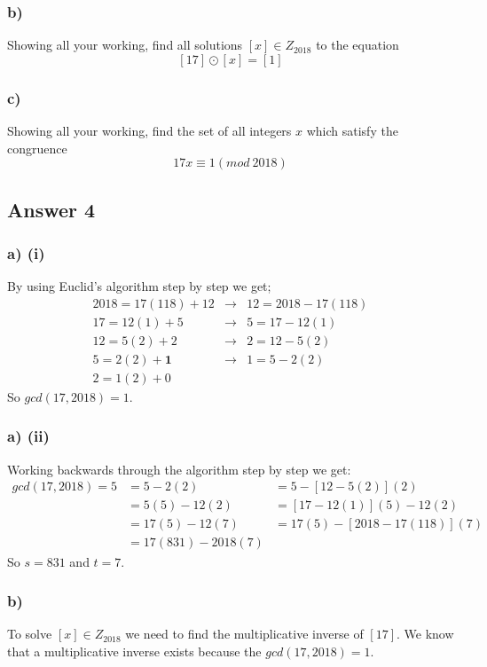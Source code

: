 \documentclass{article}
\begin{document}
	\subsubsection*{b)}
	Showing all your working, find all solutions $[x] \in Z_{2018}$ to the equation
	$$
	[17] \odot [x] = [1]
	$$
	
	\subsubsection*{c)}
	Showing all your working, find the set of all integers $x$ which satisfy the congruence
	$$
	17x \equiv 1 (mod \ 2018)
	$$
	
	\subsection*{Answer 4}
	\subsubsection*{a) (i)}
	By using Euclid's algorithm step by step we get;
	\begin{align*}
	2018 = 17(118) + 12 & \rightarrow & 12 = 2018-17(118) \\
	17=12(1)+5 & \rightarrow & 5=17-12(1) \\
	12=5(2)+2 & \rightarrow & 2=12-5(2) \\
	5=2(2)+\textbf{1} & \rightarrow & 1=5-2(2) \\
	2=1(2) + 0
	\end{align*}
	So $gcd(17,2018)=1$.

	\subsubsection*{a) (ii)}
	Working backwards through the algorithm step by step we get:
	\begin{align*}
	gcd(17,2018) =5	& = 5-2(2) 		&= 5-[12-5(2)](2) \\
		 			& = 5(5)-12(2) 	&=[17-12(1)](5)-12(2) \\
			 		& = 17(5)-12(7)	&= 17(5)-[2018-17(118)](7) \\ 
			 		& = 17(831)-2018(7) &
	\end{align*}
	So $s = 831$ and $t=7$.
	
	\subsubsection*{b)}
	To solve $[x] \in Z_{2018}$ we need to find the multiplicative inverse of $[17]$. We know that a multiplicative inverse exists because the $gcd(17,2018)=1$. 
	
\end{document}
